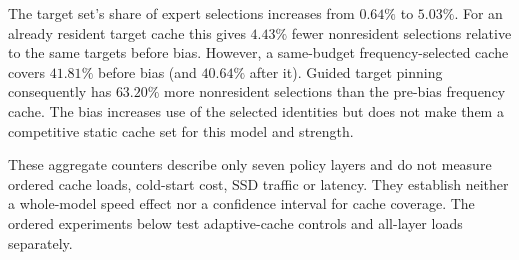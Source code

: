 The target set's share of expert selections increases from $0.64\%$ to
$5.03\%$. For an already resident target cache this gives $4.43\%$ fewer
nonresident selections relative to the same targets before bias. However,
a same-budget frequency-selected cache covers $41.81\%$ before bias
(and $40.64\%$ after it). Guided target pinning consequently has
$63.20\%$ more nonresident selections than the pre-bias frequency cache.
The bias increases use of the selected identities but does not make them
a competitive static cache set for this model and strength.

These aggregate counters describe only seven policy layers and do not
measure ordered cache loads, cold-start cost, SSD traffic or latency.
They establish neither a whole-model speed effect nor a confidence interval
for cache coverage. The ordered experiments below test adaptive-cache
controls and all-layer loads separately.
